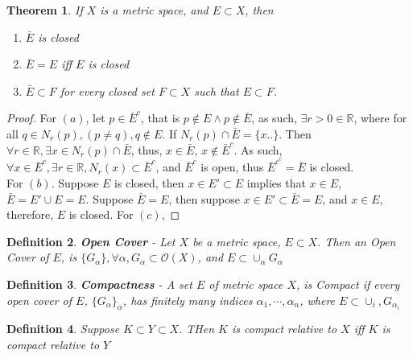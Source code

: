 \documentclass{amsart}
\numberwithin{equation}{section}
\theoremstyle{plain}
\newtheorem{thm}{Theorem}[section]
\newtheorem{dfn}[thm]{Definition}
\theoremstyle{definition}
\begin{document}
\begin{thm}
  If $X$ is a metric space, and $E \subset X$, then
  \begin{enumerate}
    \item[(a)] $\bar{E}$ is closed \\
    \item[(a)] $\bar{E} = E$ iff $E$ is closed \\
    \item[(c)] $\bar{E} \subset F$ for every closed set $F \subset X$ such that $E \subset F$.
  \end{enumerate}
\end{thm}
\begin{proof}
  For $(a)$, let $p \in \bar{E}^c$, that is $p \not \in E \wedge p \not \in \bar{E}$, as such, $\exists r > 0 \in \mathbb{R}$, 
  where for all $q \in N_r(p), (p \not= q), q \not \in E$. If $N_r(p ) \cap \bar{E} = \{x..\}$. Then $\forall r \in \mathbb{R}, \exists x \in N_r(p) \cap \bar{E}$, thus, $x \in \bar{E}$, 
  $x \not \in \bar{E}^c$. As such, $ \forall x \in \bar{E}^c, \exists r \in \mathbb{R}, N_r(x) \subset \bar{E}^c $, and $\bar{E}^c$ is open, thus
  $\bar{E}^{c^c} = \bar{E}$ is closed. \\
  For $(b)$. Suppose $E$ is closed, then $x \in E' \subset E$ implies that $x \in E$, 
  $\bar{E} = E' \cup E = E$. Suppose $\bar{E} = E$, then suppose $x \in E' \subset \bar{E} = E$, and $x \in E$,
  therefore, $E$ is closed.
  For $(c)$,
\end{proof}
\begin{dfn}
  \textbf{Open Cover} - Let $X$ be a metric space, $E \subset X$. Then an \textit{Open Cover}
  of $E$, is $\{G_{\alpha}\}, \forall \alpha,  G_{\alpha} \subset \mathcal{O}(X) $, and $E \subset \cup_{\alpha} G_{\alpha} $
\end{dfn}
\begin{dfn}
  \textbf{Compactness} - A set $E$ of metric space $X$, is \textit{Compact} if every open cover of $E$, $\{G_{\alpha}\}_{\alpha}$,
  has finitely many indices $\alpha_1, \cdots, \alpha_n$, where $E \subset \cup_{i} ,G_{\alpha_i}$
\end{dfn}
\begin{dfn}
  Suppose $K \subset Y \subset X$. THen $K$ is compact relative to $X$ iff $K$ is 
  compact relative to $Y$
\end{dfn}
\end{document}
